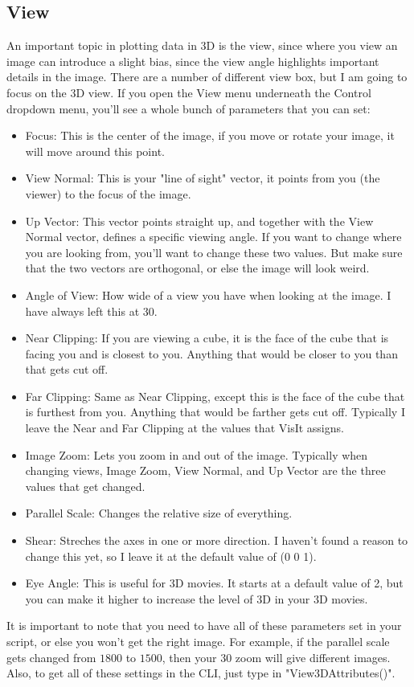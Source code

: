 \documentclass[english]{article}
\begin{document}
    \subsection{View}
    An important topic in plotting data in 3D is the view, since where you view an image can introduce a 
    slight bias, since the view angle highlights important details in the image. There are a number of 
    different view box, but I am going to focus on the 3D view. If you open the View menu
    underneath the Control dropdown menu, you'll see a whole bunch of parameters that you can set:
    \begin{itemize}
        \item Focus: This is the center of the image, if you move or rotate your image, it will move around
              this point.
        \item View Normal: This is your "line of sight" vector, it points from you (the viewer) to the focus
              of the image.
        \item Up Vector: This vector points straight up, and together with the View Normal vector, defines a
              specific viewing angle. If you want to change where you are looking from, you'll want to 
              change these two values. But make sure that the two vectors are orthogonal, or else the image
              will look weird.
        \item Angle of View: How wide of a view you have when looking at the image. I have always left this
              at 30.
        \item Near Clipping: If you are viewing a cube, it is the face of the cube that is facing you and is
              closest to you. Anything that would be closer to you than that gets cut off.
        \item Far Clipping: Same as Near Clipping, except this is the face of the cube that is furthest from
              you. Anything that would be farther gets cut off. Typically I leave the Near and Far Clipping
              at the values that VisIt assigns.
        \item Image Zoom: Lets you zoom in and out of the image. Typically when changing views, Image Zoom, 
              View Normal, and Up Vector are the three values that get changed.
        \item Parallel Scale: Changes the relative size of everything.
        \item Shear: Streches the axes in one or more direction. I haven't found a reason to change this yet,
              so I leave it at the default value of (0 0 1).
        \item Eye Angle: This is useful for 3D movies. It starts at a default value of 2, but you can make it
              higher to increase the level of 3D in your 3D movies.   
    \end{itemize}        
    It is important to note that you need to have all of these parameters set in your script, or else you won't 
    get the right image. For example, if the parallel scale gets changed from $1800$ to $1500$, then your $30$
    zoom will give different images. Also, to get all of these settings in the CLI, just type in 
    "View3DAttributes()".
\end{document}

